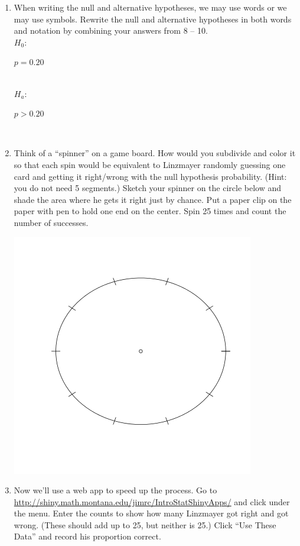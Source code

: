 \begin{enumerate}
   \item \label{ESP-hyps} When writing the null and alternative
     hypotheses, we may use words or we may use symbols.  Rewrite the
     null and alternative hypotheses in both words and notation by
     combining your answers
     from 8 -- 10.\\
     $H_0$:
\begin{students}
  \vspace{1.2cm}
\end{students}
\begin{key}
{\it $p = 0.20$}
\end{key}
\\
     $H_a$:
\begin{students}
  \vspace{1.2cm}
\end{students}
\begin{key}
{\it $p > 0.20$}
\end{key}
\\
     \item Think of a ``spinner'' on a game board. How would you
       subdivide and color it so that each spin would be equivalent to
       Linzmayer randomly guessing one card and getting it right/wrong
       with the null hypothesis probability.  (Hint: you do not need 5
       segments.) Sketch your spinner on the circle below and shade the area
       where he gets it right just by chance. Put a paper clip on the
       paper with pen to hold one end on the center.  Spin 25 times
       and count the number of successes.

       \includegraphics[width=.3\linewidth]{plots/spinnerCircle.png}
\vspace{-1cm}

  \item Now we'll use a web app to speed up the process.  Go to
     \url{http://shiny.math.montana.edu/jimrc/IntroStatShinyApps/} and click
        under the  menu.
       Enter the counts to show how many Linzmayer got right and got
       wrong. (These should add up to 25, but neither is 25.)
       Click ``Use These Data'' and record his proportion correct.


\end{enumerate}
